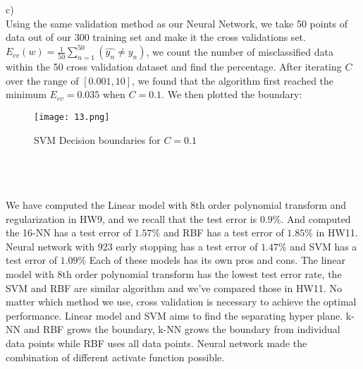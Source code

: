 \documentclass[12pt]{article}
\newcommand{\D}{\displaystyle}
\begin{document}
c)\\
\indent Using the same validation method as our Neural Network, we take 50 points of data out of our 300 training set and make it the cross validations set. $\D E_{cv}(w) = \frac{1}{50}\sum_{n=1}^{50}(\hat{y_n} \neq y_n)$, we count the number of misclassified data within the 50 cross validation dataset and find the percentage. After iterating $C$ over the range of $\left[ 0.001,10 \right]$, we found that the algorithm first reached the minimum $E_{cv} = 0.035$ when $C = 0.1$. We then plotted the boundary:
\begin{figure}[H]
  \centering
  \texttt{[image: 13.png]}
  \caption{SVM Decision boundaries for $C = 0.1$}
  \label{fig:1}
\end{figure}\indent\\

 \\\\
\indent We have computed the Linear model with 8th order polynomial transform and regularization in HW9, and we recall that the test error is $0.9\%$.  And computed the 16-NN has a test error of $1.57\%$ and RBF has a test error of $1.85\%$ in HW11. Neural network with 923 early stopping has a test error of $1.47\%$ and SVM has a test error of $1.09\%$
Each of these models has its own pros and cons. The linear model with 8th order polynomial transform has the lowest test error rate, the SVM and RBF are similar algorithm and we've compared those in HW11. No matter which method we use, cross validation is necessary to achieve the optimal performance. Linear model and SVM aims to find the separating hyper plane. k-NN and RBF grows the boundary, k-NN grows the boundary from individual data points while RBF uses all data points. Neural network made the combination of different activate function possible.
\end{document}
